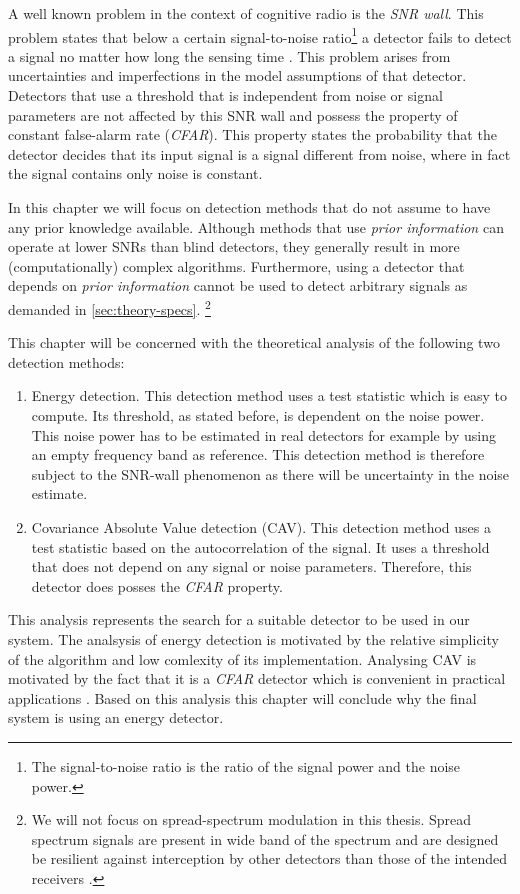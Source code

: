 \documentclass[a4paper, openany, oneside]{memoir}
\begin{document}
A well known problem in the context of cognitive radio is the \emph{SNR wall}. This problem states that below a certain signal-to-noise ratio\footnote{The signal-to-noise ratio is the ratio of the signal power and the noise power.} a detector fails to detect a signal no matter how long the sensing time \cite{sahai2009spectrum}. This problem arises from uncertainties and imperfections in the model assumptions of that detector. Detectors that use a threshold that is independent from noise or signal parameters are not affected by this SNR wall \cite{axell2012spectrum} and possess the property of constant false-alarm rate (\emph{CFAR}). This property states the probability that the detector decides that its input signal is a signal different from noise, where in fact the signal contains only noise is constant. 

In this chapter we will focus on detection methods that do not assume to have any prior knowledge available. Although methods that use \emph{prior information} can operate at lower SNRs than blind detectors, they generally result in more (computationally) complex algorithms. Furthermore, using a detector that depends on \emph{prior information} cannot be used to detect arbitrary signals as demanded in \cref{sec:theory-specs}. \footnote{We will not focus on spread-spectrum modulation in this thesis. Spread spectrum signals are present in wide band of the spectrum and are designed be resilient against interception by other detectors than those of the intended receivers \cite{pickholtz1982theory,gevargiz1989adaptive}.}

This chapter will be concerned with the theoretical analysis of the following two detection methods:

\begin{enumerate}
	\item Energy detection. This detection method uses a test statistic which is easy to compute. Its threshold, as stated before, is dependent on 
	the noise power. This noise power has to be estimated in real detectors for example by using an empty frequency band as reference. This detection method is therefore subject to the SNR-wall phenomenon as there will be uncertainty in the noise estimate.
	\item Covariance Absolute Value detection (CAV). This detection method uses a test statistic based on the autocorrelation of 
	the signal. It uses a threshold that does not depend on any signal or noise parameters. Therefore, this detector does posses the \emph{CFAR}
	property.
\end{enumerate}

This analysis represents the search for a suitable detector to be used in our system.  The analsysis of energy detection is motivated by the relative simplicity of the algorithm and low comlexity of its implementation. Analysing CAV is motivated by the fact that it is a \emph{CFAR} detector which is convenient in practical applications \cite{axell2012spectrum}.  Based on this analysis this chapter will conclude why the final system is using an energy detector. 
\end{document}
